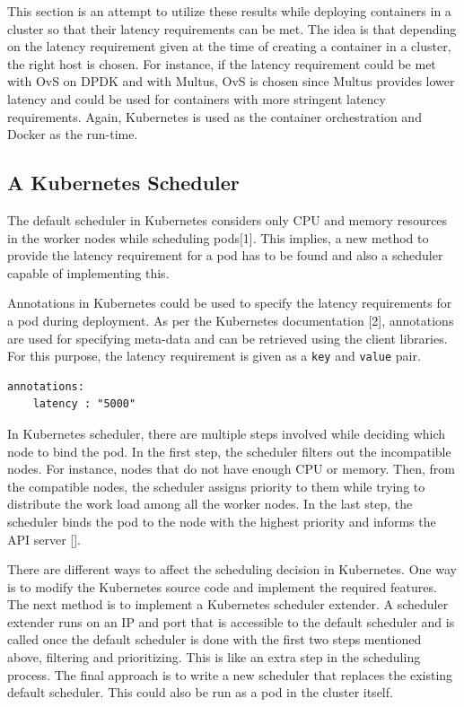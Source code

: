 \documentclass[english, 12pt, a4paper, elec, utf8, a-1b, online]{aaltothesis}
\begin{document}
This section is an attempt to utilize these results while deploying containers in a cluster so that their latency requirements can be met. The idea is that depending on the latency requirement given at the time of creating a container in a cluster, the right host is chosen. For instance, if the latency requirement could be met with OvS on DPDK and with Multus, OvS is chosen since Multus provides lower latency and could be used for containers with more stringent latency requirements. Again, Kubernetes is used as the container orchestration and Docker as the run-time.

\subsection{A Kubernetes Scheduler}
The default scheduler in Kubernetes considers only CPU and memory resources in the worker nodes while scheduling pods[1]. This implies, a new method to provide the latency requirement for a pod has to be found and also a scheduler capable of implementing this.

Annotations in Kubernetes could be used to specify the latency requirements for a pod during deployment. As per the Kubernetes documentation [2], annotations are used for specifying meta-data and can be retrieved using the client libraries. For this purpose, the latency requirement is given as a \lstinline{key} and \lstinline{value} pair.
\begin{lstlisting}[basicstyle={\small\ttfamily}]
  annotations:
    latency : "5000"
\end{lstlisting}

In Kubernetes scheduler, there are multiple steps involved while deciding which node to bind the pod. In the first step, the scheduler filters out the incompatible nodes. For instance, nodes that do not have enough CPU or memory. Then, from the compatible nodes, the scheduler assigns priority to them while trying to distribute the work load among all the worker nodes. In the last step, the scheduler binds the pod to the node with the highest priority and informs the API server [].

There are different ways to affect the scheduling decision in Kubernetes. One way is to modify the Kubernetes source code and implement the required features. The next method is to implement a Kubernetes scheduler extender. A scheduler extender runs on an IP and port that is accessible to the default scheduler and is called once the default scheduler is done with the first two steps mentioned above, filtering and prioritizing. This is like an extra step in the scheduling process. The final approach is to write a new scheduler that replaces the existing default scheduler. This could also be run as a pod in the cluster itself.
\end{document}
